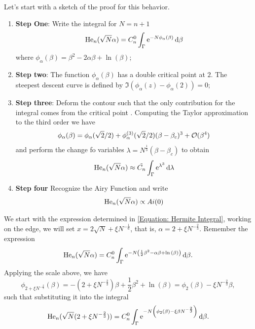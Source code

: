 Let's start with a sketch of the proof for this behavior.
\begin{enumerate}
	\item \textbf{Step One}: Write the integral for $N = n + 1$
	\begin{equation}
		\mathrm{He}_n(\sqrt{N}\alpha) = C_n^0 \int_{\Gamma}  \operatorname{e}^{-N \phi_\alpha(\beta) } \mathrm{d} \beta
	\end{equation} 
	where $\phi_\alpha(\beta) = \beta^2 -2 \alpha \beta + \ln{(\beta)}$;
	\item \textbf{Step two}: The function $\phi_{\alpha}(\beta)$ has a double critical point at $2$. The steepest descent curve is defined by $\Im(\phi_{\alpha}(z) - \phi_{\alpha}(2)) = 0$;
	\item \textbf{Step three}: Deform the contour such that the only contribution for the integral comes from the critical point . Computing the Taylor approximation to the third order we have
	\begin{equation}
		\phi_{\alpha}(\beta) = \phi_\alpha(\sqrt{2}/2) + \phi^{(3)}_\alpha(\sqrt{2}/2) (\beta - \beta_c)^3 + \mathcal{O}(\beta^4)  
	\end{equation}
	and perform the change fo variables $\lambda = N^{\frac{1}{3}}(\beta-\beta_c)$ to obtain
	\begin{equation}
		\mathrm{He}_n(\sqrt{N}\alpha) \approx \tilde{C_n} \int_{\Gamma}  \operatorname{e}^{\lambda^3} \mathrm{d} \lambda
	\end{equation} 
	\item \textbf{Step four} Recognize the Airy Function and write
	\begin{equation}
		\mathrm{He}_n(\sqrt{N}\alpha) \propto Ai(0)
	\end{equation}
\end{enumerate}

We start with the expression determined in \eqref{Equation: Hermite Integral}, working on the edge, we will set $x = 2\sqrt{N} + \xi N^{-\frac{1}{6}}$, that is, $\alpha = 2 + \xi N^{-\frac{2}{3}}$. Remember the expression
\begin{equation}
	\mathrm{He}_n(\sqrt{N}\alpha) = C_n^0 \int_{\Gamma}  \operatorname{e}^{-N \left( \frac{1}{2} \beta^2 - \alpha \beta + \ln{(\beta)} \right) } \mathrm{d} \beta.
\end{equation}
Applying the scale above, we have
\begin{equation}
	\phi_{2 + \xi N^{-\frac{2}{3}}}(\beta) = -(2 + \xi N^{-\frac{2}{3}})\beta + \frac{1}{2} \beta^2 + \ln(\beta) = \phi_{2}(\beta) - \xi N^{-\frac{2}{3}} \beta,
\end{equation}
such that substituting it into the integral
\begin{equation}
	\mathrm{He}_n(\sqrt{N}(2 + \xi N^{-\frac{2}{3}})) = C_n^0 \int_{\Gamma}  \operatorname{e}^{-N \left( \phi_{2}(\beta) - \xi \beta N^{-\frac{2}{3}} \right) } \mathrm{d} \beta.
\end{equation}

